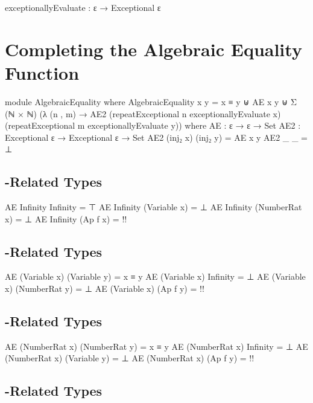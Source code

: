 \documentclass{report}
\begin{document}
\begin{code}
exceptionallyEvaluate : ε → Exceptional ε
\end{code}

\section{Completing the Algebraic Equality Function}

\begin{code}
module AlgebraicEquality where
AlgebraicEquality x y =
  x ≡ y ⊎
  AE x y ⊎
  Σ (ℕ × ℕ) (λ (n , m) → AE2 (repeatExceptional n exceptionallyEvaluate x)
                             (repeatExceptional m exceptionallyEvaluate y))
  where
  AE : ε → ε → Set
  AE2 : Exceptional ε → Exceptional ε → Set
  AE2 (inj₂ x) (inj₂ y) = AE x y
  AE2 _ _ = ⊥
\end{code}

\subsection{-Related Types}

\begin{code}
  AE Infinity Infinity = ⊤
  AE Infinity (Variable x) = ⊥
  AE Infinity (NumberRat x) = ⊥
  AE Infinity (Ap f x) = {!!}
\end{code}

\subsection{-Related Types}

\begin{code}
  AE (Variable x) (Variable y) = x ≡ y
  AE (Variable x) Infinity = ⊥
  AE (Variable x) (NumberRat y) = ⊥
  AE (Variable x) (Ap f y) = {!!}
\end{code}

\subsection{-Related Types}

\begin{code}
  AE (NumberRat x) (NumberRat y) = x ≡ y
  AE (NumberRat x) Infinity = ⊥
  AE (NumberRat x) (Variable y) = ⊥
  AE (NumberRat x) (Ap f y) = {!!}
\end{code}

\subsection{-Related Types}
\end{document}
